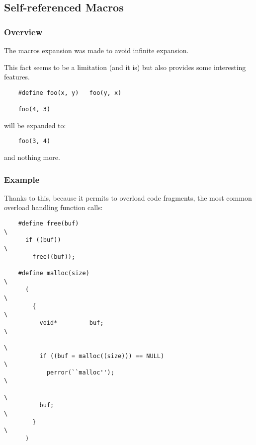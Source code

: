 \documentclass[8pt]{beamer}
\newcommand{\nl}[0]{\vspace{0.4cm}}
\begin{document}
%
%

\subsection{Self-referenced Macros}


\begin{frame}[containsverbatim]
  \frametitle{Overview}

  The macros expansion was made to avoid infinite expansion.

  \nl

  This fact seems to be a limitation (and it is) but also provides
  some interesting features.

  \begin{verbatim}
    #define foo(x, y)   foo(y, x)

    foo(4, 3)
  \end{verbatim}

  will be expanded to:

  \begin{verbatim}
    foo(3, 4)
  \end{verbatim}

  and nothing more.
\end{frame}


\begin{frame}[containsverbatim]
  \frametitle{Example}

  Thanks to this, because it permits to overload code fragments, the most
  common overload handling function calls:

  \begin{verbatim}
    #define free(buf)                                                   \
      if ((buf))                                                        \
        free((buf));

    #define malloc(size)                                                \
      (                                                                 \
        {                                                               \
          void*         buf;                                            \
                                                                        \
          if ((buf = malloc((size))) == NULL)                           \
            perror(``malloc'');                                         \
                                                                        \
          buf;                                                          \
        }                                                               \
      )
  \end{verbatim}
\end{frame}
\end{document}
